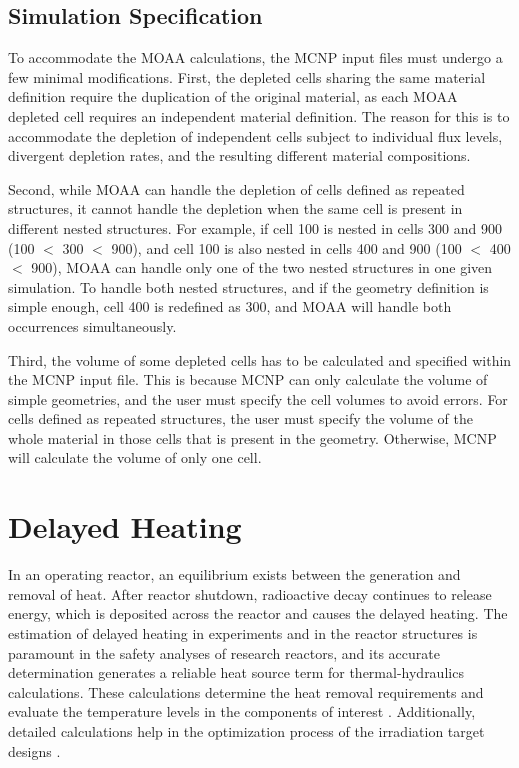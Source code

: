 \subsection{Simulation Specification}

To accommodate the MOAA calculations, the MCNP input files must undergo a few minimal modifications.
First, the depleted cells sharing the same material definition require the duplication of the original material, as each MOAA depleted cell requires an independent material definition.
The reason for this is to accommodate the depletion of independent cells subject to individual flux levels, divergent depletion rates, and the resulting different material compositions.

Second, while MOAA can handle the depletion of cells defined as repeated structures, it cannot handle the depletion when the same cell is present in different nested structures.
For example, if cell 100 is nested in cells 300 and 900 (100 $<$ 300 $<$ 900), and cell 100 is also nested in cells 400 and 900 (100 $<$ 400 $<$ 900), MOAA can handle only one of the two nested structures in one given simulation.
To handle both nested structures, and if the geometry definition is simple enough, cell 400 is redefined as 300, and MOAA will handle both occurrences simultaneously.

Third, the volume of some depleted cells has to be calculated and specified within the MCNP input file.
This is because MCNP can only calculate the volume of simple geometries, and the user must specify the cell volumes to avoid errors.
For cells defined as repeated structures, the user must specify the volume of the whole material in those cells that is present in the geometry.
Otherwise, MCNP will calculate the volume of only one cell.


\section{Delayed Heating}

In an operating reactor, an equilibrium exists between the generation and removal of heat.
After reactor shutdown, radioactive decay continues to release energy, which is deposited across the reactor and causes the delayed heating.
The estimation of delayed heating in experiments and in the reactor structures is paramount in the safety analyses of research reactors, and its accurate determination generates a reliable heat source term for thermal-hydraulics calculations.
These calculations determine the heat removal requirements and evaluate the temperature levels in the components of interest \cite{fairhurst_decay_2022, fairhurst_machine_2022, fairhurst_machine_2_2022}.
Additionally, detailed calculations help in the optimization process of the irradiation target designs \cite{peterson-droogh_current_2018}.

